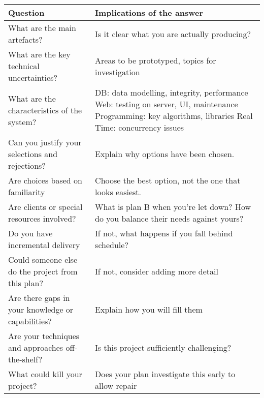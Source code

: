 \documentclass[a4paper,11pt]{techplan}
\begin{document}
\begin{center}
    \begin{tabularx}{\textwidth}{|X|X|}
    
    \hline
    \textbf{Question} & \textbf{Implications of the answer} \\
    \hline
    What are the main artefacts? & Is it clear what you are actually producing?\\
    \hline
    What are the key technical uncertainties? & Areas to be prototyped, topics for investigation\\
    \hline
    What are the characteristics of the system? & DB: data modelling, integrity, performance\linebreak%
    Web: testing on server, UI, maintenance\linebreak%
    Programming: key algorithms, libraries\linebreak%
    Real Time: concurrency issues\\
    \hline
    Can you justify your selections and rejections? & Explain why options have been chosen.\\
    \hline
    Are choices based on familiarity & Choose the best option, not the one that looks easiest.\\
    \hline
    Are clients or special resources involved? & What is plan B when you're let down?
How do you balance their needs against yours?\\
    \hline
    Do you have incremental delivery & If not, what happens if you fall behind schedule?\\
    \hline
    Could someone else do the project from this plan? & If not, consider adding more detail\\
    \hline
    Are there gaps in your knowledge or capabilities? & Explain how you will fill them\\
    \hline
    Are your techniques and approaches off-the-shelf? & Is this project sufficiently challenging?\\
    \hline
    What could kill your project? & Does your plan investigate this early to allow repair\\
    \hline
    \end{tabularx}
\end{center}
\end{document}
